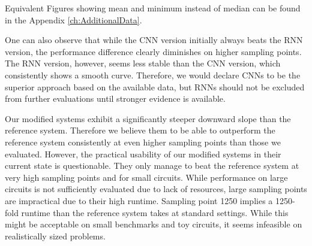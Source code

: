 Equivalent Figures showing mean and minimum instead of median can be found in the Appendix \ref{ch:AdditionalData}.

One can also observe that while the \gls{CNN} version initially always beats the \gls{RNN} version, the performance difference clearly diminishes on higher sampling points. The \gls{RNN} version, however, seems less stable than the \gls{CNN} version, which consistently shows a smooth curve. Therefore, we would declare \glspl{CNN} to be the superior approach based on the available data, but \glspl{RNN} should not be excluded from further evaluations until stronger evidence is available.

Our modified systems exhibit a significantly steeper downward slope than the reference system. Therefore we believe them to be able to outperform the reference system consistently at even higher sampling points than those we evaluated. However, the practical usability of our modified systems in their current state is questionable. They only manage to beat the reference system at very high sampling points and for small circuits. While performance on large circuits is not sufficiently evaluated due to lack of resources, large sampling points are impractical due to their high runtime. Sampling point 1250 implies a 1250-fold runtime than the reference system takes at standard settings. While this might be acceptable on small benchmarks and toy circuits, it seems infeasible on realistically sized problems.

